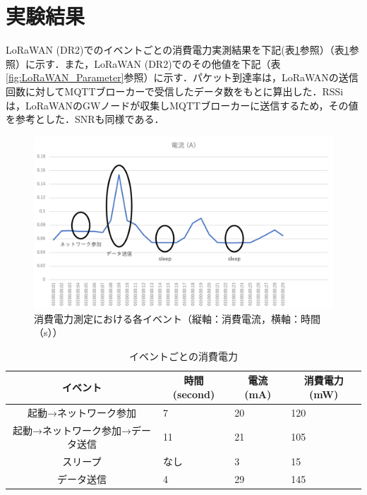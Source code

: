\section{実験結果}
LoRaWAN (DR2)でのイベントごとの消費電力実測結果を下記(表\ref{fig:result_power_consumtion}参照）（表\ref{fig:LoRaWAN_PowerConsumption}参照）に示す．また，LoRaWAN (DR2)でのその他値を下記（表\ref{fig:LoRaWAN_Parameter}参照）に示す．パケット到達率は，LoRaWANの送信回数に対してMQTTブローカーで受信したデータ数をもとに算出した．RSSiは，LoRaWANのGWノードが収集しMQTTブローカーに送信するため，その値を参考とした．SNRも同様である．

\begin{figure}[]
    \begin{center}
    \includegraphics[width=15cm]{figures/LoRaWAN_消費電力実験.png}
    \caption{消費電力測定における各イベント（縦軸：消費電流，横軸：時間（s））}
    \label{fig:result_power_consumtion}
    \end{center}
\end{figure}

\begin{table}[]
    \caption{イベントごとの消費電力}\label{fig:LoRaWAN_PowerConsumption}
    \centering
    \begin{tabular}{|c|l|l|l|}
    \hline
    \textbf{イベント}     & \multicolumn{1}{c|}{\textbf{時間 (second)}} & \multicolumn{1}{c|}{\textbf{電流 (mA)}} & \multicolumn{1}{c|}{\textbf{消費電力 (mW)}} \\ \hline
    起動→ネットワーク参加       & 7                                         & 20                                    & 120                                     \\ \hline
    起動→ネットワーク参加→データ送信 & 11                                        & 21                                    & 105                                     \\ \hline
    スリープ              & なし                                        & 3                                     & 15                                      \\ \hline
    データ送信             & 4                                         & 29                                    & 145                                     \\ \hline
    \end{tabular}
\end{table}

